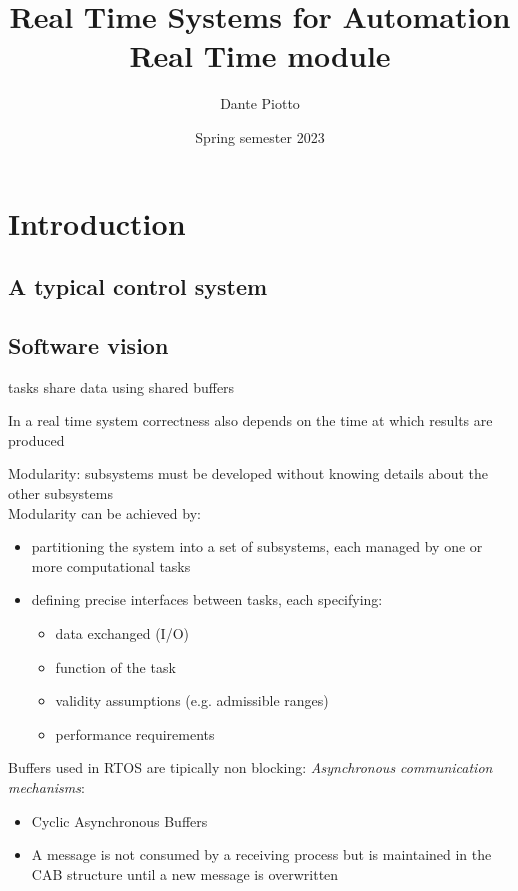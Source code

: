 \documentclass{book}
\title{Real Time Systems for Automation\\Real Time module}
\author{Dante Piotto}
\date{Spring semester 2023}
\begin{document}
\maketitle

\chapter{Introduction}

\section{A typical control system}
\section{Software vision}
tasks share data using shared buffers

In a real time system correctness also depends on the time at which results are produced

Modularity: subsystems must be developed without knowing details about the other subsystems\\
Modularity can be achieved by: \begin{itemize}
    \item partitioning the system into a set of subsystems, each managed by one or more computational tasks
    \item defining precise interfaces between tasks, each specifying: \begin{itemize}
        \item data exchanged (I/O)
        \item function of the task
        \item validity assumptions (e.g. admissible ranges)
        \item performance requirements
    \end{itemize}
\end{itemize}
Buffers used in RTOS are tipically non blocking: \emph{Asynchronous communication mechanisms}:
\begin{itemize}
    \item Cyclic Asynchronous Buffers
    \item A message is not consumed by a receiving process but is maintained in the CAB structure until a new message is overwritten
\end{itemize}
\end{document}
